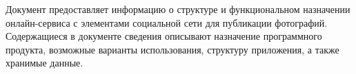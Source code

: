 
Документ предоставляет информацию о структуре и функциональном назначении онлайн-сервиса с элементами социальной сети для публикации фотографий.
Содержащиеся в документе сведения описывают назначение программного продукта, возможные варианты использования, структуру приложения, а также хранимые данные.

\clearpage